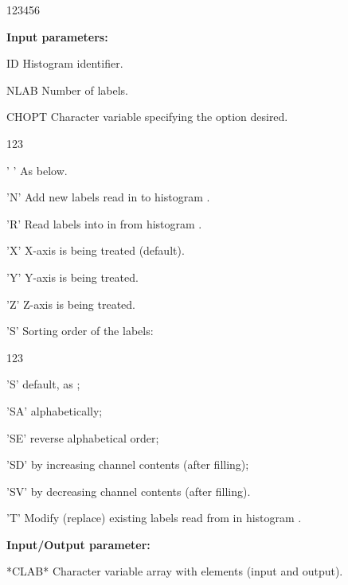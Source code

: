 \begin{DLtt}{123456}
\item[{\rm\bf Input parameters:}]
\item[ID]     Histogram identifier.
\item[NLAB]   Number of labels.
\item[CHOPT]  Character variable specifying the option desired.
              \begin{DLtt}{123}
                \item[' '] As  below.
                \item['N'] Add  new labels read in 
                           to histogram .
                \item['R'] Read  labels into in 
                           from histogram .
                \item['X'] X-axis is being treated (default).
                \item['Y'] Y-axis is being treated.
                \item['Z'] Z-axis is being treated.
                \item['S'] Sorting order of the labels:
                           \begin{DLtt}{123}
                             \item['S']  default, as ;
                             \item['SA'] alphabetically;
                             \item['SE'] reverse alphabetical order;
                             \item['SD'] by increasing channel contents
                                         (after filling);
                             \item['SV'] by decreasing channel contents
                                         (after filling).
                           \end{DLtt}
                \item['T'] Modify (replace)  existing labels read from 
                            in histogram .
              \end{DLtt}
\item[{\rm\bf Input/Output parameter:}]
\item[*CLAB*] Character variable array with
               elements (input and output).
\end{DLtt}

